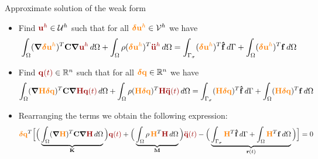 \documentclass[aspectratio=169]{beamer}
\begin{document}
\begin{frame}{Approximate solution of the weak form}
  \begin{itemize}
    \item Find ${\color{darkred}\mathbf u^{h}}\in\mathcal U^{h}$ such that for all ${\color{orange}\boldsymbol\delta\mathbf u^{h}}\in\mathcal V^{h}$ we have
          $$\int_{\Omega} (\boldsymbol\nabla {\color{orange}\bolddelta\mathbf u^{h}} )^{T} \mathbf C\boldsymbol\nabla {\color{darkred}\mathbf u^{h}}\, d\Omega+\int_{\Omega} \rho({\color{orange}\bolddelta\mathbf u^{h}})^{T}{\color{darkred}\mathbf{\ddot{u}}^{h}}\, d\Omega=\int_{\Gamma_\sigma} ({\color{orange}\bolddelta\mathbf u^{h}})^{T}\mathbf{\hat f} \, d\Gamma+\int_{\Omega}  ({\color{orange}\bolddelta\mathbf u^{h}})^{T}\mathbf f\, d\Omega$$
    \item   Find ${\color{darkred}\mathbf q(t)}\in\mathbb R^{n}$ such that for all ${\color{orange}\boldsymbol\delta\mathbf q}\in\mathbb R^{n}$ we have
          $$\int_{\Omega} (\boldsymbol\nabla{\color{orange} \mathbf H\bolddelta\mathbf q})^{T} \mathbf C\boldsymbol\nabla {\color{darkred}\mathbf H\mathbf q(t)}\, d\Omega+\int_{\Omega} \rho( {\color{orange}\mathbf H\bolddelta\mathbf q})^{T} {\color{darkred}\mathbf H\mathbf{\ddot{q}}(t)}\, d\Omega=\int_{\Gamma_\sigma} ({\color{orange}\mathbf H\bolddelta\mathbf q})^{T}\mathbf{\hat f} \, d\Gamma+\int_{\Omega}  ({\color{orange}\mathbf H\bolddelta\mathbf q})^{T}\mathbf f\, d\Omega$$
    \item  Rearranging the terms we obtain the following expression:
          {\small $${\color{orange}\bolddelta\mathbf q}^{T}\Big[\Big(\underbrace{\int_{\Omega} (\boldsymbol\nabla {\color{orange}\mathbf H})^{T} \mathbf C\boldsymbol\nabla {\color{darkred}\mathbf H}\, d\Omega}_\text{$\mathbf K$}\Big) {\color{darkred}\mathbf q(t)}+\Big(\underbrace{\int_{\Omega} \rho\, {\color{orange}\mathbf H}^{T} {\color{darkred}\mathbf H}\, d\Omega}_\text{$\mathbf M$}\Big) {\color{darkred}\mathbf{\ddot{q}}(t)}-\Big(\underbrace{\int_{\Gamma_\sigma} {\color{orange}\mathbf H}^{T}\mathbf{\hat f} \, d\Gamma+\int_{\Omega} {\color{orange}\mathbf H}^{T}\mathbf f\, d\Omega}_\text{$\mathbf r(t)$}\Big)\Big]=0$$}
  \end{itemize}
\end{frame}
\end{document}
